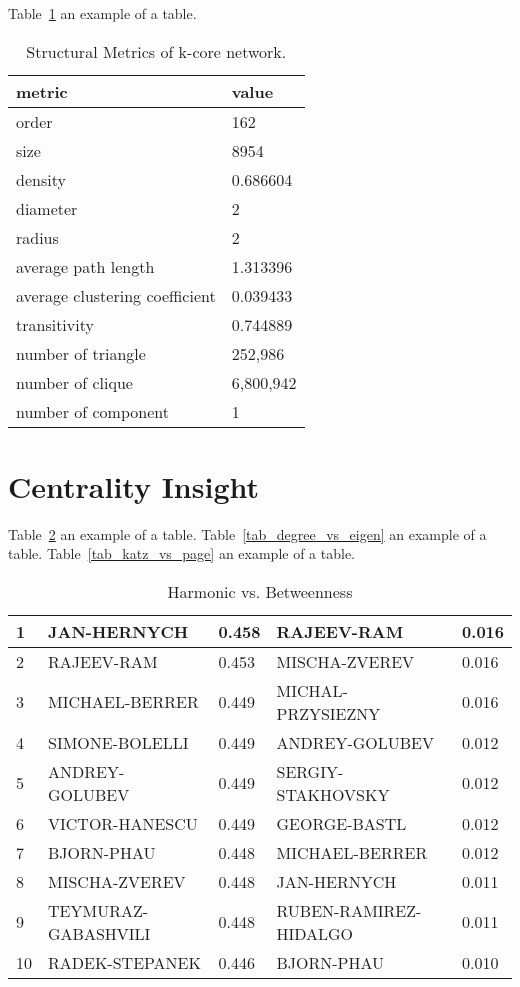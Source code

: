 \documentclass[runningheads]{llncs}
\begin{document}
Table~\ref{tab_kcore} an example of a table.
\begin{table}
\caption{Structural Metrics of k-core network.}\label{tab_kcore}
\begin{tabular}{|l|l|}
\hline
metric & value \\
\hline
order & 162 \\
size & 8954 \\
density & 0.686604 \\
diameter & 2 \\
radius & 2 \\
average path length & 1.313396 \\
average clustering coefficient & 0.039433 \\
transitivity & 0.744889 \\
number of triangle & 252,986 \\
number of clique & 6,800,942 \\
number of component & 1 \\
\hline
\end{tabular}
\end{table}






\section{Centrality Insight}

Table~\ref{tab_h_vs_b} an example of a table.
Table~\ref{tab_degree_vs_eigen} an example of a table.
Table~\ref{tab_katz_vs_page} an example of a table.

\begin{table}
\centering
\caption{Harmonic vs. Betweenness}\label{tab_h_vs_b}
\begin{tabular}{|l|l|l|l|l|}
\hline

1 & JAN-HERNYCH & 0.458 & RAJEEV-RAM & 0.016 \\ \hline
2 & RAJEEV-RAM & 0.453 & MISCHA-ZVEREV & 0.016 \\ \hline
3 & MICHAEL-BERRER & 0.449 & MICHAL-PRZYSIEZNY & 0.016 \\ \hline
4 & SIMONE-BOLELLI & 0.449 & ANDREY-GOLUBEV & 0.012 \\ \hline
5 & ANDREY-GOLUBEV & 0.449 & SERGIY-STAKHOVSKY & 0.012 \\ \hline
6 & VICTOR-HANESCU & 0.449 & GEORGE-BASTL & 0.012 \\ \hline
7 & BJORN-PHAU & 0.448 & MICHAEL-BERRER & 0.012 \\ \hline
8 & MISCHA-ZVEREV & 0.448 & JAN-HERNYCH & 0.011 \\ \hline
9 & TEYMURAZ-GABASHVILI & 0.448 & RUBEN-RAMIREZ-HIDALGO & 0.011 \\ \hline
10 & RADEK-STEPANEK & 0.446 & BJORN-PHAU & 0.010 \\ \hline
\end{tabular}
\end{table}
\end{document}
